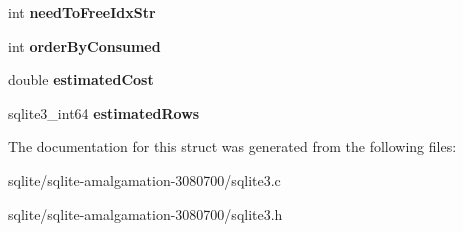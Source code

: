 \begin{DoxyCompactItemize}
\item 
\hypertarget{structsqlite3__index__info_a5410066c067c3891cdf165c70cc4d6b1}{int {\bfseries need\+To\+Free\+Idx\+Str}}\label{structsqlite3__index__info_a5410066c067c3891cdf165c70cc4d6b1}

\item 
\hypertarget{structsqlite3__index__info_a5515d9de0f37f68d7e0930c20a668b29}{int {\bfseries order\+By\+Consumed}}\label{structsqlite3__index__info_a5515d9de0f37f68d7e0930c20a668b29}

\item 
\hypertarget{structsqlite3__index__info_aa8b4fe1d2ee38aab57ba5e1da00d7830}{double {\bfseries estimated\+Cost}}\label{structsqlite3__index__info_aa8b4fe1d2ee38aab57ba5e1da00d7830}

\item 
\hypertarget{structsqlite3__index__info_adcdf25dcf9848a6fedf539bb9c921b7f}{sqlite3\+\_\+int64 {\bfseries estimated\+Rows}}\label{structsqlite3__index__info_adcdf25dcf9848a6fedf539bb9c921b7f}

\end{DoxyCompactItemize}


The documentation for this struct was generated from the following files\+:\begin{DoxyCompactItemize}
\item 
sqlite/sqlite-\/amalgamation-\/3080700/sqlite3.\+c\item 
sqlite/sqlite-\/amalgamation-\/3080700/sqlite3.\+h\end{DoxyCompactItemize}
